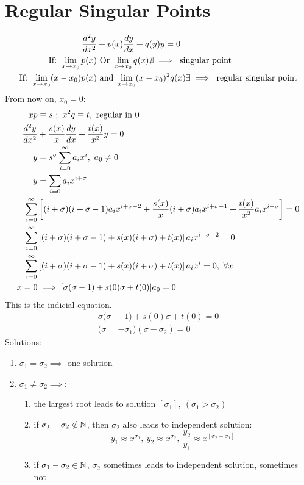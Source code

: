 \documentclass[Maths.tex]{subfiles}
\begin{document}
\section{Regular Singular Points}
\begin{align*}
    \frac{d^2 y}{dx^2} &+ p(x)\frac{dy}{dx} + q(y)y = 0 \\
    \text{If: } \lim_{x\to x_0} p(x) &\text{ Or } \lim_{x\to x_0} q(x) \nexists \implies \text{ singular point} \\
    \text{If: } \lim_{x \to x_0} (x-x_0)p(x) &\text{ and } \lim_{x\to x_0} (x-x_0)^2q(x) \exists \implies \text{ regular singular point}
\end{align*}
From now on, $x_0 = 0$:
\begin{align*}
    xp &\equiv s ~;~ x^2q \equiv t,~ \text{regular in }0 \\
    \frac{d^2 y}{dx^2} &+ \frac{s(x)}{x}\frac{dy}{dx} + \frac{t(x)}{x^2}y = 0 \\
    y &= s^\sigma \sum_{i=0}^\infty a_ix^i,~ a_0 \neq 0 \\
    y &= \sum_{i=0}a_ix^{i+\sigma} \\
    \sum_{i=0}^\infty &\left[(i+\sigma)(i+\sigma-1)a_ix^{i+\sigma-2} + \frac{s(x)}{x}(i+\sigma)a_ix^{i+\sigma-1}+ \frac{t(x)}{x^2}a_ix^{i+\sigma}\right] = 0 \\
    \sum_{i=0}^\infty & \left[(i+\sigma)(i+\sigma-1)+s(x)(i+\sigma)+t(x)\right]a_ix^{i+\sigma-2} = 0 \\
    \sum_{i=0}^\infty & \left[(i+\sigma)(i+\sigma-1) + s(x)(i+\sigma)+t(x)\right]a_ix^i = 0,~ \forall x \\
    x = 0 &\implies [\sigma(\sigma-1) + s(0)\sigma + t(0)]a_0 = 0
\end{align*}
This is the indicial equation.
\begin{align*}
    \sigma(\sigma &- 1) + s(0)\sigma + t(0) = 0 \\
    (\sigma &- \sigma_1)(\sigma - \sigma_2) = 0
\end{align*}
Solutions:
\begin{enumerate}
    \item $\sigma_1 = \sigma_2 \implies$ one solution
    \item $\sigma_1 \neq \sigma_2 \implies$:
    \begin{enumerate}
        \item the largest root leads to solution $[\sigma_1],~ (\sigma_1 > \sigma_2)$
        \item if $\sigma_1 - \sigma_2 \notin \mathbb{N}$, then $\sigma_2$ also leads to independent solution:
        \begin{equation*}
            y_1 \approx x^{\sigma_1},~ y_2 \approx x^{\sigma_2},~ \frac{y_2}{y_1} \approx x^{[\sigma_2 - \sigma_1]}
        \end{equation*}
        \item if $\sigma_1 - \sigma_2 \in \mathbb{N}$, $\sigma_2$ sometimes leads to independent solution, sometimes not
    \end{enumerate}
\end{enumerate}
\end{document}
